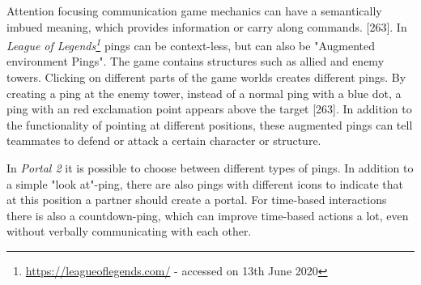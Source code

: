 Attention focusing communication game mechanics can have a semantically imbued meaning, which provides information or carry along commands. \autocite{Toups2014ATheory}[263].
In \textit{League of Legends\footnote{\url{https://leagueoflegends.com/} - accessed on 13th June 2020}} pings can be context-less, but can also be "Augmented environment Pings". The game contains structures such as allied and enemy towers. Clicking on different parts of the game worlds creates different pings. By creating a ping at the enemy tower, instead of a normal ping with a blue dot, a ping with an red exclamation point appears above the target \autocite{Toups2014ATheory}[263]. In addition to the functionality of pointing at different positions, these augmented pings can tell teammates to defend or attack a certain character or structure.

In \textit{Portal 2} it is possible to choose between different types of pings. In addition to a simple "look at"-ping, there are also pings with different icons to indicate that at this position a partner should create a portal. For time-based interactions there is also a countdown-ping, which can improve time-based actions a lot, even without verbally communicating with each other.